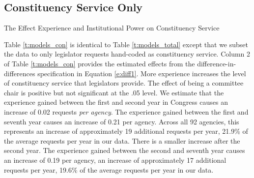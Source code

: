  




\subsection{Constituency Service Only}

\begin{table}[hbt!]
\caption{The Effect Experience and Institutional Power on Constituency Service} \label{t:models_con}
\begin{minipage}{\textwidth}
\begin{center}
\end{center}
\end{minipage}
\end{table}

Table \ref{t:models_con} is identical to Table \ref{t:models_total} except that we subset the data to only legislator requests hand-coded as constituency service. 
Column 2 of Table \ref{t:models_con} provides the estimated effects from the difference-in-differences specification in Equation \ref{e:diff1}. More experience increases the level of constituency service that legislators provide. The effect of being a committee chair is positive but not significant at the .05 level. We estimate that the experience gained between the first and second year in Congress causes an increase of 0.02 requests \textit{per agency}. The experience gained between the first and seventh year causes an increase of 0.21 per agency. Across all 92 agencies, this represents an increase of approximately 19 additional requests per year, 21.9\% of the average requests per year in our data. There is a smaller increase after the second year. The experience gained between the second and seventh year causes an increase of 0.19 per agency, an increase of approximately 17 additional requests per year, 19.6\% of the average requests per year in our data.



